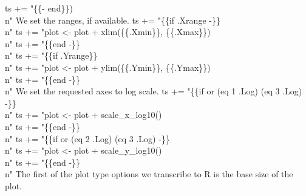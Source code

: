 ts += "\{\{- end\}\})\\n"
\nwendcode{}\nwdocspar
We set the ranges, if available.
\nwenddocs{}\plusendmoddef\nwstartdeflinemarkup{}\nwenddeflinemarkup
ts += "\{\{if .Xrange -\}\}\\n"
ts += "plot <- plot + xlim(\{\{.Xmin\}\}, \{\{.Xmax\}\})\\n"
ts += "\{\{end -\}\}\\n"
ts += "\{\{if .Yrange\}\}\\n"
ts += "plot <- plot + ylim(\{\{.Ymin\}\}, \{\{.Ymax\}\})\\n"
ts += "\{\{end -\}\}\\n"
\nwendcode{}\nwdocspar
We set the requested axes to log scale.
\nwenddocs{}\plusendmoddef\nwstartdeflinemarkup{}\nwenddeflinemarkup
ts += "\{\{if or (eq 1 .Log) (eq 3 .Log) -\}\}\\n"
ts += "plot <- plot + scale_x_log10()\\n"
ts += "\{\{end -\}\}\\n"
ts += "\{\{if or (eq 2 .Log) (eq 3 .Log) -\}\}\\n"
ts += "plot <- plot + scale_y_log10()\\n"
ts += "\{\{end -\}\}\\n"
\nwendcode{}\nwdocspar
The first of the plot type options we transcribe to R is the base
size of the plot.
\nwenddocs{}\endmoddef\nwstartdeflinemarkup{}\nwenddeflinemarkup
